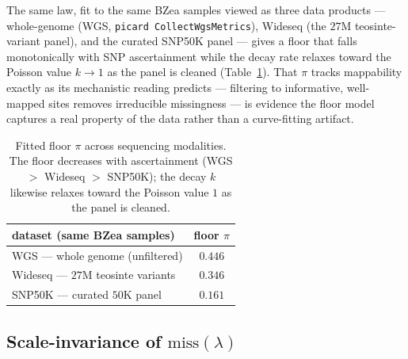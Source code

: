 \documentclass[11pt]{article}
\newcommand{\miss}{\mathrm{miss}}
\newcommand{\cov}{\lambda}                          %
\begin{document}
The same law, fit to the same BZea samples viewed as three data products ---
whole-genome (WGS, \texttt{picard CollectWgsMetrics}), Wideseq (the $27$M
teosinte-variant panel), and the curated SNP50K panel --- gives a floor that
falls monotonically with SNP ascertainment while the decay rate relaxes toward the
Poisson value $k\to1$ as the panel is cleaned (Table~\ref{tab:modality}). That
$\pi$ tracks mappability exactly as its mechanistic reading predicts --- filtering
to informative, well-mapped sites removes irreducible missingness --- is evidence
the floor model captures a real property of the data rather than a curve-fitting
artifact.
\begin{table}[t]
\centering
\begin{tabular}{l c}
\toprule
dataset (same BZea samples) & floor $\pi$ \\
\midrule
WGS --- whole genome (unfiltered)      & $0.446$ \\
Wideseq --- $27$M teosinte variants    & $0.346$ \\
SNP50K --- curated $50$K panel         & $0.161$ \\
\bottomrule
\end{tabular}
\caption{Fitted floor $\pi$ across sequencing modalities. The floor decreases with
ascertainment (WGS $>$ Wideseq $>$ SNP50K); the decay $k$ likewise relaxes toward
the Poisson value $1$ as the panel is cleaned.}
\label{tab:modality}
\end{table}

\subsection{Scale-invariance of $\miss(\cov)$}
\label{sec:ergodicity}
\end{document}
